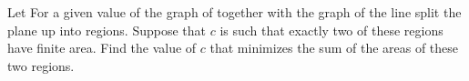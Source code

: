 Let   For a given value of  the graph of  together with the graph of the line  split the plane up into regions.  Suppose that $c$ is such that exactly two of these regions have finite area.  Find the value of $c$ that minimizes the sum of the areas of these two regions.